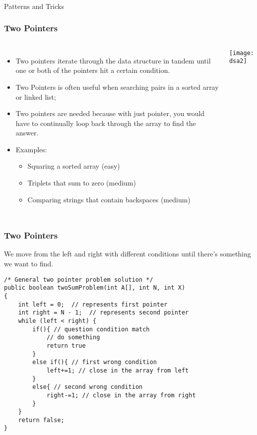 \begin{frame}[fragile]\frametitle{}
\begin{center}
{\Large Patterns and Tricks}
\end{center}
\end{frame}

\begin{frame}[fragile]
	\frametitle{Two Pointers}
	
	\begin{columns}[T]
			\begin{itemize}
				\item Two pointers iterate through the data structure in tandem until one or both of the pointers hit a certain condition.
				\item Two Pointers is often useful when searching pairs in a sorted array or linked list; 
				\item Two pointers are needed because with just pointer, you would have to continually loop back through the array to find the answer. 
				\item Examples:
			\begin{itemize}
				\item Squaring a sorted array (easy)
				\item Triplets that sum to zero (medium)
				\item Comparing strings that contain backspaces (medium)
			\end{itemize}

			\end{itemize}
			
		
\begin{center}
\texttt{[image: dsa2]}
\end{center}			
	\end{columns}
\end{frame}

\begin{frame}[fragile]
	\frametitle{Two Pointers}
	
We move from the left and right with different conditions until there’s something we want to find.

		
\begin{lstlisting}
/* General two pointer problem solution */ 
public boolean twoSumProblem(int A[], int N, int X)  
{  
    int left = 0;  // represents first pointer  
    int right = N - 1;  // represents second pointer  
    while (left < right) {  
        if(){ // question condition match 
            // do something 
            return true 
        } 
        else if(){ // first wrong condition 
            left+=1; // close in the array from left 
        } 
        else{ // second wrong condition 
            right-=1; // close in the array from right 
        } 
    }  
    return false;  
}  				
\end{lstlisting}			
\end{frame}


